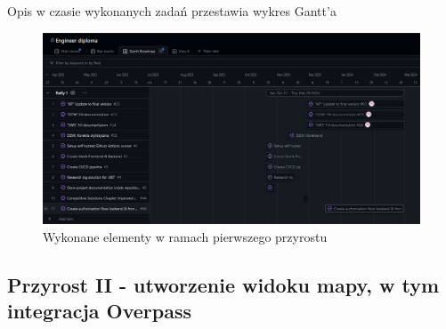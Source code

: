 Opis w czasie wykonanych zadań przestawia wykres Gantt'a
\begin{figure}[H]
    \centering
    \includegraphics[width=1\textwidth]{attachments/RALLY1}
    \caption{Wykonane elementy w ramach pierwszego przyrostu}
    \label{fig:figure}
    \end{figure}

    \subsection{Przyrost II - utworzenie widoku mapy, w tym integracja  Overpass}
    \label{sec:przyrost2}

